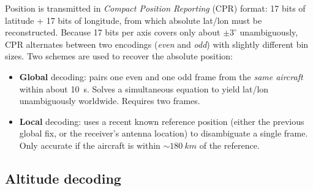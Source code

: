\documentclass[11pt,a4paper]{article}
\begin{document}
Position is transmitted in \emph{Compact Position Reporting} (CPR)
format: 17 bits of latitude + 17 bits of longitude, from which
absolute lat/lon must be reconstructed.  Because 17 bits per axis
covers only about $\pm 3^\circ$ unambiguously, CPR alternates between
two encodings (\emph{even} and \emph{odd}) with slightly different bin
sizes.  Two schemes are used to recover the absolute position:

\begin{itemize}
  \item \textbf{Global} decoding: pairs one even and one odd frame from
        the \emph{same aircraft} within about \SI{10}{s}.  Solves a
        simultaneous equation to yield lat/lon unambiguously worldwide.
        Requires two frames.
  \item \textbf{Local} decoding: uses a recent known reference position
        (either the previous global fix, or the receiver's antenna
        location) to disambiguate a single frame.  Only accurate if
        the aircraft is within $\sim\SI{180}{km}$ of the reference.
\end{itemize}

\begin{center}
\end{center}

\subsection{Altitude decoding}
\end{document}
